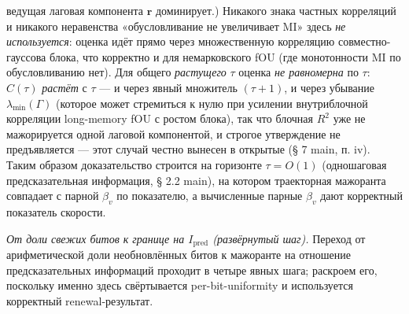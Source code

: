\documentclass[12pt]{iopart}
\begin{document}
ведущая лаговая компонента \(\mathbf r\) доминирует.) Никакого знака частных корреляций и никакого неравенства «обусловливание не увеличивает MI» здесь \emph{не используется}: оценка идёт прямо через множественную корреляцию совместно-гауссова блока, что корректно и для немарковского fOU (где монотонности MI по обусловливанию нет). Для общего \emph{растущего} \(\tau\) оценка \emph{не равномерна} по \(\tau\): \(C(\tau)\) \emph{растёт} с \(\tau\) --- и через явный множитель \((\tau+1)\), и через убывание \(\lambda_{\min}(\Gamma)\) (которое может стремиться к нулю при усилении внутриблочной корреляции long-memory fOU с ростом блока), так что блочная \(R^2\) уже не мажорируется одной лаговой компонентой, и строгое утверждение не предъявляется --- этот случай честно вынесен в открытые (§ 7 main, п. iv). Таким образом доказательство строится на горизонте \(\tau = O(1)\) (одношаговая предсказательная информация, § 2.2 main), на котором траекторная мажоранта совпадает с парной \(\beta_v\) по показателю, а вычисленные парные \(\beta_v\) дают корректный показатель скорости.



\emph{От доли свежих битов к границе на \(I_{\text{pred}}\) (развёрнутый шаг).} Переход от арифметической доли необновлённых битов к мажоранте на отношение предсказательных информаций проходит в четыре явных шага; раскроем его, поскольку именно здесь свёртывается per-bit-uniformity и используется корректный renewal-результат.
\end{document}
